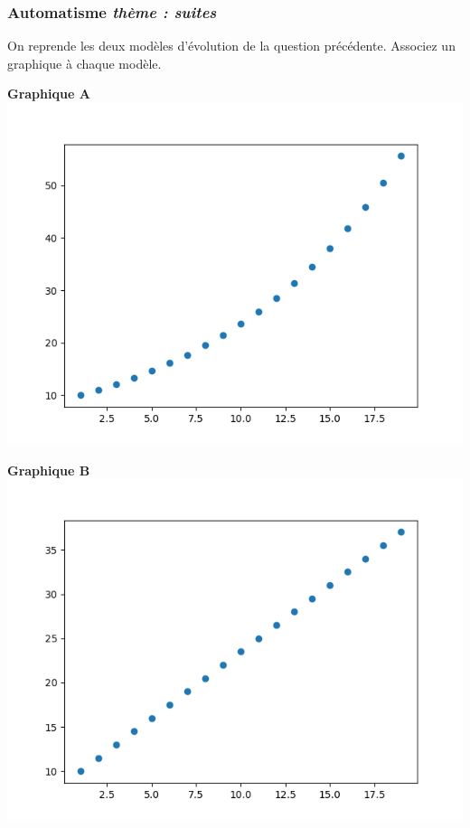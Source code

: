 \documentclass[11pt]{beamer}
\newcounter{autocompteur}
\newcommand{\automatisme}[1]{\addtocounter{autocompteur}{1}\frametitle{Automatisme  \theautocompteur  \textit{ thème : #1}}}
\begin{document}
\begin{frame}
\automatisme{suites}
On reprende les deux modèles d'évolution de la question précédente.
Associez un graphique à chaque modèle.

\begin{minipage}{0.45\linewidth}
\begin{center}
\textbf{Graphique A}
\includegraphics[scale=0.3]{ressources/modele2.png}
\end{center}
\end{minipage}\hfill
\begin{minipage}{0.45\linewidth}
\begin{center}
\textbf{Graphique B}
\includegraphics[scale=0.3]{ressources/modele1.png}
\end{center}
\end{minipage}


\end{frame}
\end{document}

